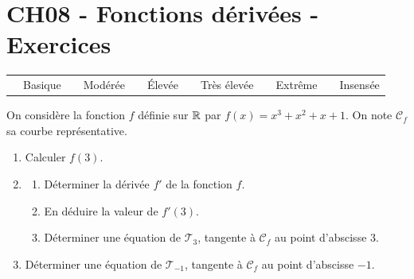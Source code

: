 \documentclass[a4paper,11pt]{article}
\author{Pierquet}
\title{\nomfichier}
\begin{document}
\pagestyle{fancy}

\part{CH08 - Fonctions dérivées - Exercices}

\medskip

\begin{caide}
{\setlength\arrayrulewidth{1.5pt} 
\begin{tabularx}{\linewidth}{Y|Y|Y|Y|Y|Y}
	~~\textsf{Basique} & ~~\textsf{Modérée} & ~~\textsf{Élevée} & ~~\textsf{Très élevée} & ~~\textsf{Extrême} & ~~\textsf{Insensée} \\
\end{tabularx}}
\end{caide}


\medskip

On considère la fonction $f$ définie sur $\R$ par $f(x)=x^3+x^2+x+1$. On note $\mathscr{C}_f$ sa courbe représentative.

\begin{enumerate}
	\item Calculer $f(3)$.
	\item
	\begin{enumerate}
		\item Déterminer la dérivée $f'$ de la fonction $f$.
		\item En déduire la valeur de $f'(3)$.
		\item Déterminer une équation de $\mathscr{T}_3$, tangente à $\mathscr{C}_f$ au point d'abscisse 3.
	\end{enumerate}
	\item Déterminer une équation de $\mathscr{T}_{-1}$, tangente à $\mathscr{C}_f$ au point d'abscisse $-1$.
\end{enumerate}

\medskip

\end{document}
